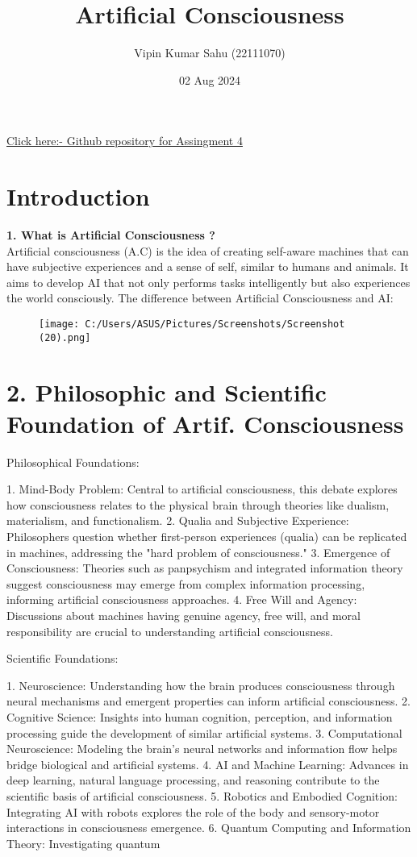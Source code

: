 \documentclass{article}
\title{Artificial Consciousness}
\author{Vipin Kumar Sahu (22111070)}
\date{02 Aug 2024}
\begin{document}
\maketitle
\href{https://github.com/Vipin70Sahu/AI_Assingment_22111070_-Vipin-}{Click here:- Github repository for Assingment 4}
\section{Introduction}


\textbf{ 1. What is Artificial Consciousness ? } \\
\LARGE Artificial consciousness (A.C) is the idea of creating self-aware machines that can have subjective experiences and a sense of self, similar to humans and animals. It aims to develop AI that not only performs tasks intelligently but also experiences the world consciously.
\LARGE The difference between Artificial Consciousness and AI: 
\begin{figure}[h!]
    \centering
    \texttt{[image: C:/Users/ASUS/Pictures/Screenshots/Screenshot (20).png]}
    \caption{}
    \label{}
\end{figure}

\vspace{2em}

\section*{2. Philosophic and Scientific Foundation of Artif. Consciousness } 

Philosophical Foundations:

1. Mind-Body Problem: Central to artificial consciousness, this debate explores how consciousness relates to the physical brain through theories like dualism, materialism, and functionalism.
2. Qualia and Subjective Experience: Philosophers question whether first-person experiences (qualia) can be replicated in machines, addressing the "hard problem of consciousness."
3. Emergence of Consciousness: Theories such as panpsychism and integrated information theory suggest consciousness may emerge from complex information processing, informing artificial consciousness approaches.
4. Free Will and Agency: Discussions about machines having genuine agency, free will, and moral responsibility are crucial to understanding artificial consciousness.

Scientific Foundations:

1. Neuroscience: Understanding how the brain produces consciousness through neural mechanisms and emergent properties can inform artificial consciousness.
2. Cognitive Science: Insights into human cognition, perception, and information processing guide the development of similar artificial systems.
3. Computational Neuroscience: Modeling the brain's neural networks and information flow helps bridge biological and artificial systems.
4. AI and Machine Learning:  Advances in deep learning, natural language processing, and reasoning contribute to the scientific basis of artificial consciousness.
5. Robotics and Embodied Cognition: Integrating AI with robots explores the role of the body and sensory-motor interactions in consciousness emergence.
6. Quantum Computing and Information Theory: Investigating quantum 
\end{document}
